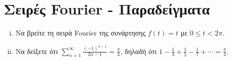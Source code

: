 \documentclass[a4paper,table]{report}
\begin{document}
\chapter*{Σειρές \textlatin{Fourier} - Παραδείγματα}


\begin{mybox3}
  \begin{example}
  \item{}
  \item{}
    \begin{enumerate}[i)]
      \item Να βρείτε τη σειρά \textlatin{Fourier} της συνάρτησης $ f(t)=t $ με $ 0 \leq t < 2 \pi $.
      \item Να δείξετε ότι $ \sum_{n=1}^{\infty} \frac{(-1)^{n-1}}{2n-1} = 
        \frac{\pi}{4} $, δηλαδή ότι $ 1 - \frac{1}{3} + \frac{1}{5} - \frac{1}{7}
        + \cdots = \frac{\pi}{4} $.
    \end{enumerate}
  \end{example}
\end{mybox3}
\end{document}

